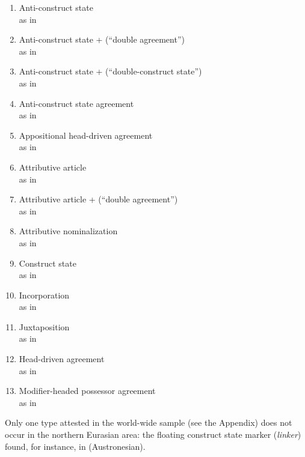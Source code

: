 \begin{enumerate}
\item Anti\hyp{}construct state\\as in 
\item Anti\hyp{}construct state +  (“double agreement”)\\as in 
\item Anti\hyp{}construct state +  (“double\hyp{}construct state”)\\as in 
\item Anti\hyp{}construct state agreement\\as in 
\item Appositional head\hyp{}driven agreement\\as in 
\item Attributive article\\as in 
\item Attributive article +  (“double agreement”)\\as in 
\item Attributive nominalization\\as in 
\item Construct state\\as in 
\item Incorporation\\as in 
\item Juxtaposition\\as in 
\item Head\hyp{}driven agreement\\as in 
\item Modifier\hyp{}headed possessor agreement\\as in 
\end{enumerate}

Only one type attested in the world-wide sample (see the Appendix) does not occur in the northern Eurasian area: the floating construct state marker (\textit{linker}) found, for instance, in  (Austronesian). 

